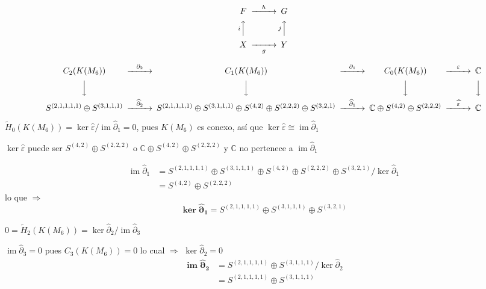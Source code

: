 \documentclass[12pt]{book}
\theoremstyle{definition}
\DeclareMathOperator{\im}{im}
\newcounter{in}
\begin{document}
\[
\begin{CD}
  F@>{h}>>G\\
@A{i} AA  @A{j}AA\\
X @>>{g}>Y
\end{CD}
\]

  \[
  \begin{CD}
    C_{2}(K(M_{6})) @>{\partial_{2}}>> C_{1}(K(M_{6})) @>{\partial_{1}}>> C_{0}(K(M_{6})) @>{\varepsilon}>> \mathbb{C}\\
    @VVV   @VVV   @VVV   @VVV    \\
    S^{(2,1,1,1,1)}\oplus S^{(3,1,1,1)} @>{\widehat\partial_{2}}>>
    S^{(2,1,1,1,1)}\oplus S^{(3,1,1,1)}\oplus S^{(4,2)}\oplus S^{(2,2,2)}\oplus S^{(3,2,1)} @>{\widehat\partial_{1}}>> 
    \mathbb{C} \oplus S^{(4,2)}\oplus S^{(2,2,2)} @>{\widehat \varepsilon}>>  \mathbb{C}
  \end{CD}
  \]
  
  $\widetilde H_{0}(K(M_{6}))=\ker\widehat\varepsilon/\im\widehat\partial_{1}=0$, pues
  $K(M_{6})$ es conexo, así que
  $\ker\widehat\varepsilon\cong\im\widehat\partial_{1}$

  $\ker\widehat\varepsilon$ puede ser $S^{(4,2)}\oplus S^{(2,2,2)}$ o $
  \mathbb{C} \oplus S^{(4,2)}\oplus S^{(2,2,2)}$ y $\mathbb{C}$ no
  pertenece a $\im\widehat\partial_{1}$
  
  \begin{align*}
      \im\widehat\partial_{1}&=S^{(2,1,1,1,1)}\oplus S^{(3,1,1,1)}\oplus S^{(4,2)}\oplus S^{(2,2,2)}\oplus S^{(3,2,1)}/\ker\widehat\partial_{1}\\
      &=S^{(4,2)}\oplus S^{(2,2,2)}
  \end{align*}
 lo que $\Rightarrow$
 $$\boldsymbol{\ker\widehat\partial_{1}}=S^{(2,1,1,1,1)}\oplus S^{(3,1,1,1)}\oplus S^{(3,2,1)}$$

 $0=\widetilde H_{2}(K(M_{6}))=\ker\widehat\partial_{2}/\im\widehat\partial_{3}$

 $\im\widehat\partial_{3}=0$ pues $C_{3}(K(M_{6}))=0$ lo cual
 $\Rightarrow$ $\ker\widehat\partial_{2}=0$
 \begin{align*}
   \boldsymbol{\im\widehat\partial_{2}}&=S^{(2,1,1,1,1)}\oplus
   S^{(3,1,1,1)}/\ker\widehat\partial_{2}\\
   &=S^{(2,1,1,1,1)}\oplus S^{(3,1,1,1)}
 \end{align*}
\end{document}
